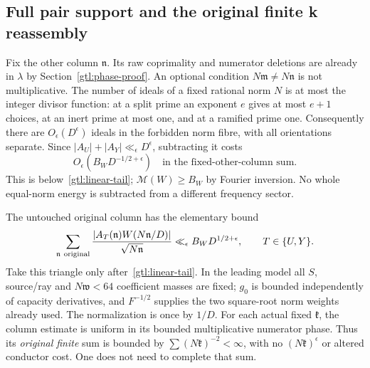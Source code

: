 \subsection{Full pair support and the original finite k reassembly}
\label{gtl:reassembly-proof}
Fix the other column $\mathfrak n$. Its raw coprimality
and numerator deletions are already in $\lambda$ by
Section~\ref{gtl:phase-proof}.
An optional condition $N\mathfrak m\ne N\mathfrak n$ is
not multiplicative. The number of ideals of a fixed
rational norm $N$ is at most the integer divisor function:
at a split prime an exponent $e$ gives at most $e+1$
choices, at an inert prime at most one, and at a
ramified prime one. Consequently there are
$O_\epsilon(D^\epsilon)$ ideals in the forbidden norm
fibre, with all orientations separate.
Since $|A_U|+|A_Y|\ll_\epsilon D^\epsilon$, subtracting it
costs
\begin{equation}\label{gtl:equal-fibre-cost}
 O_\epsilon(B_WD^{-1/2+\epsilon})
 \quad\text{in the fixed-other-column sum}.
\end{equation}
This is below~\eqref{gtl:linear-tail};
$\mathcal M(W)\ge B_W$ by Fourier inversion.
No whole equal-norm energy is subtracted from a different
frequency sector.

The untouched original column has the elementary bound
\begin{equation}\label{gtl:other-column}
 \sum_{\mathfrak n\ {\rm original}}
       \frac{|A_T(\mathfrak n)W(N\mathfrak n/D)|}
            {\sqrt{N\mathfrak n}}
       \ll_\epsilon B_WD^{1/2+\epsilon},
                 \qquad T\in\{U,Y\}.
\end{equation}
Take this triangle only after~\eqref{gtl:linear-tail}.
In the leading model all $S$, source/ray and
$N\mathfrak w<64$ coefficient masses are fixed;
$g_0$ is bounded independently of capacity derivatives,
and $F^{-1/2}$ supplies the two square-root norm weights
already used. The normalization is once by $1/D$.
For each actual fixed $\mathfrak k$, the column estimate
is uniform in its bounded multiplicative numerator
phase. Thus its \emph{original finite} sum is bounded by
$\sum(N\mathfrak k)^{-2}<\infty$, with no
$(N\mathfrak k)^\epsilon$ or altered conductor cost.
One does not need to complete that sum.

